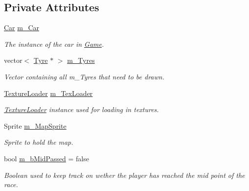 \subsection*{Private Attributes}
\begin{DoxyCompactItemize}
\item 
\hypertarget{class_game_ac542da39deb8370524eb7573a3dac252}{}\hyperlink{class_car}{Car} \hyperlink{class_game_ac542da39deb8370524eb7573a3dac252}{m\+\_\+\+Car}\label{class_game_ac542da39deb8370524eb7573a3dac252}

\begin{DoxyCompactList}\small\item\em The instance of the car in \hyperlink{class_game}{Game}. \end{DoxyCompactList}\item 
\hypertarget{class_game_a8937c3fbd8360865d71f3352cbf56ea9}{}vector$<$ \hyperlink{class_tyre}{Tyre} $\ast$ $>$ \hyperlink{class_game_a8937c3fbd8360865d71f3352cbf56ea9}{m\+\_\+\+Tyres}\label{class_game_a8937c3fbd8360865d71f3352cbf56ea9}

\begin{DoxyCompactList}\small\item\em Vector containing all m\+\_\+\+Tyres that need to be drawn. \end{DoxyCompactList}\item 
\hypertarget{class_game_a66fd394e4813c7c0cb9dda72ad7739ca}{}\hyperlink{class_texture_loader}{Texture\+Loader} \hyperlink{class_game_a66fd394e4813c7c0cb9dda72ad7739ca}{m\+\_\+\+Tex\+Loader}\label{class_game_a66fd394e4813c7c0cb9dda72ad7739ca}

\begin{DoxyCompactList}\small\item\em \hyperlink{class_texture_loader}{Texture\+Loader} instance used for loading in textures. \end{DoxyCompactList}\item 
\hypertarget{class_game_a6425cac6484cfcb4d8d3436bb9a5c6c6}{}Sprite \hyperlink{class_game_a6425cac6484cfcb4d8d3436bb9a5c6c6}{m\+\_\+\+Map\+Sprite}\label{class_game_a6425cac6484cfcb4d8d3436bb9a5c6c6}

\begin{DoxyCompactList}\small\item\em Sprite to hold the map. \end{DoxyCompactList}\item 
\hypertarget{class_game_a1171e3aa8d0fbc5c59c92c8cff68896d}{}bool \hyperlink{class_game_a1171e3aa8d0fbc5c59c92c8cff68896d}{m\+\_\+b\+Mid\+Passed} = false\label{class_game_a1171e3aa8d0fbc5c59c92c8cff68896d}

\begin{DoxyCompactList}\small\item\em Boolean used to keep track on wether the player has reached the mid point of the race. \end{DoxyCompactList}\end{DoxyCompactItemize}


